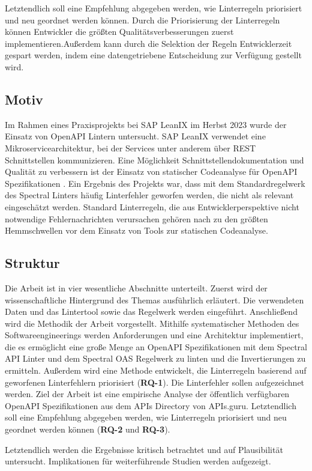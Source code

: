 Letztendlich soll eine Empfehlung abgegeben werden, wie Linterregeln priorisiert und neu geordnet werden können. Durch die Priorisierung der Linterregeln können Entwickler die größten Qualitätsverbesserungen zuerst implementieren.Außerdem kann durch die Selektion der Regeln Entwicklerzeit gespart werden, indem eine datengetriebene Entscheidung zur Verfügung gestellt wird.

\subsection{Motiv} \label{sec:motiv}
Im Rahmen eines Praxisprojekts bei SAP LeanIX im Herbst 2023 wurde der Einsatz von OpenAPI Lintern untersucht. SAP LeanIX verwendet eine Mikroservicearchitektur, bei der Services unter anderem über REST Schnittstellen kommunizieren. Eine Möglichkeit Schnittstellendokumentation und Qualität zu verbessern ist der Einsatz von statischer Codeanalyse für OpenAPI Spezifikationen \parencite{bogner_restruler_2024}. Ein Ergebnis des Projekts war, dass mit dem Standardregelwerk des Spectral Linters häufig Linterfehler geworfen werden, die nicht als relevant eingeschätzt werden. Standard Linterregeln, die aus Entwicklerperspektive nicht notwendige Fehlernachrichten verursachen gehören nach \parencite{christakis_what_2016} zu den größten Hemmschwellen vor dem Einsatz von Tools zur statischen Codeanalyse. 

\subsection{Struktur} \label{sec:struktur}
Die Arbeit ist in vier wesentliche Abschnitte unterteilt. Zuerst wird der wissenschaftliche Hintergrund des Themas ausführlich erläutert. Die verwendeten Daten und das Lintertool sowie das Regelwerk werden eingeführt. Anschließend wird die Methodik der Arbeit vorgestellt. Mithilfe systematischer Methoden des Softwareengineerings werden Anforderungen und eine Architektur implementiert, die es ermöglicht eine große Menge an OpenAPI Spezifikationen mit dem Spectral API Linter und dem Spectral OAS Regelwerk zu linten und die Invertierungen zu ermitteln. Außerdem wird eine Methode entwickelt, die Linterregeln basierend auf geworfenen Linterfehlern priorisiert (\textbf{RQ-1}).
Die Linterfehler sollen aufgezeichnet werden. Ziel der Arbeit ist eine empirische Analyse der öffentlich verfügbaren OpenAPI Spezifikationen aus dem APIs Directory von APIs.guru. Letztendlich soll eine Empfehlung abgegeben werden, wie Linterregeln priorisiert und neu  geordnet werden können (\textbf{RQ-2} und \textbf{RQ-3}). 

Letztendlich werden die Ergebnisse kritisch betrachtet und auf Plausibilität untersucht. Implikationen für weiterführende Studien werden aufgezeigt.
